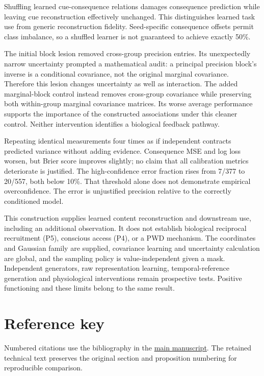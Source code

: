 \documentclass[
  american,
  11pt,
  letterpaper,
]{article}
\begin{document}
Shuffling learned cue-consequence relations damages consequence prediction while leaving cue reconstruction effectively unchanged. This distinguishes learned task use from generic reconstruction fidelity. Seed-specific consequence offsets permit class imbalance, so a shuffled learner is not guaranteed to achieve exactly 50\%.

The initial block lesion removed cross-group precision entries. Its unexpectedly narrow uncertainty prompted a mathematical audit: a principal precision block's inverse is a conditional covariance, not the original marginal covariance. Therefore this lesion changes uncertainty as well as interaction. The added marginal-block control instead removes cross-group covariance while preserving both within-group marginal covariance matrices. Its worse average performance supports the importance of the constructed associations under this cleaner control. Neither intervention identifies a biological feedback pathway.

Repeating identical measurements four times as if independent contracts predicted variance without adding evidence. Consequence MSE and log loss worsen, but Brier score improves slightly; no claim that all calibration metrics deteriorate is justified. The high-confidence error fraction rises from 7/377 to 20/557, both below 10\%. That threshold alone does not demonstrate empirical overconfidence. The error is unjustified precision relative to the correctly conditioned model.

This construction supplies learned content reconstruction and downstream use, including an additional observation. It does not establish biological reciprocal recruitment (P5), conscious access (P4), or a PWD mechanism. The coordinates and Gaussian family are supplied, covariance learning and uncertainty calculation are global, and the sampling policy is value-independent given a mask. Independent generators, raw representation learning, temporal-reference generation and physiological interventions remain prospective tests. Positive functioning and these limits belong to the same result.

\section{Reference key}\label{reference-key}

Numbered citations use the bibliography in the \href{https://raw.githubusercontent.com/v5ma/v5ma.github.io/master/papers/companions/learning-to-feel-v1.0/Learning-to-Feel-v1.0.pdf}{main manuscript}. The retained technical text preserves the original section and proposition numbering for reproducible comparison.
\end{document}
